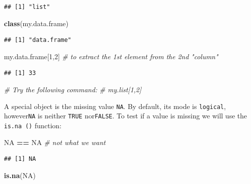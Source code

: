 \documentclass[]{book}
\newenvironment{Shaded}{\begin{snugshade}}{\end{snugshade}}
\newcommand{\CommentTok}[1]{\textcolor[rgb]{0.56,0.35,0.01}{\textit{#1}}}
\newcommand{\DecValTok}[1]{\textcolor[rgb]{0.00,0.00,0.81}{#1}}
\newcommand{\KeywordTok}[1]{\textcolor[rgb]{0.13,0.29,0.53}{\textbf{#1}}}
\newcommand{\NormalTok}[1]{#1}
\newcommand{\OperatorTok}[1]{\textcolor[rgb]{0.81,0.36,0.00}{\textbf{#1}}}
\newcommand{\OtherTok}[1]{\textcolor[rgb]{0.56,0.35,0.01}{#1}}
\newcommand{\StringTok}[1]{\textcolor[rgb]{0.31,0.60,0.02}{#1}}
\begin{document}
\begin{verbatim}
## [1] "list"
\end{verbatim}

\begin{Shaded}
\begin{Highlighting}[]
\KeywordTok{class}\NormalTok{(my.data.frame)}
\end{Highlighting}
\end{Shaded}

\begin{verbatim}
## [1] "data.frame"
\end{verbatim}

\begin{Shaded}
\begin{Highlighting}[]
\NormalTok{my.data.frame[}\DecValTok{1}\NormalTok{,}\DecValTok{2}\NormalTok{] }\CommentTok{# to extract the 1st element from the 2nd "column"}
\end{Highlighting}
\end{Shaded}

\begin{verbatim}
## [1] 33
\end{verbatim}

\begin{Shaded}
\begin{Highlighting}[]
\CommentTok{# Try the following command:}
\CommentTok{# my.list[1,2]}
\end{Highlighting}
\end{Shaded}

A special object is the missing value \texttt{NA}. By default, its mode is \texttt{logical}, however\texttt{NA} is neither \texttt{TRUE} nor\texttt{FALSE}. To test if a value is missing we will use the \texttt{is.na\ ()} function:

\begin{Shaded}
\begin{Highlighting}[]
\OtherTok{NA} \OperatorTok{==}\StringTok{ }\OtherTok{NA} \CommentTok{# not what we want}
\end{Highlighting}
\end{Shaded}

\begin{verbatim}
## [1] NA
\end{verbatim}

\begin{Shaded}
\begin{Highlighting}[]
\KeywordTok{is.na}\NormalTok{(}\OtherTok{NA}\NormalTok{)}
\end{Highlighting}
\end{Shaded}
\end{document}
